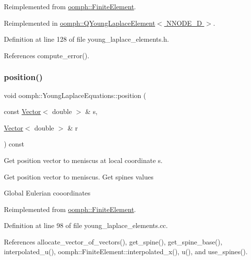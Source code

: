 Reimplemented from \hyperlink{classoomph_1_1FiniteElement_a2a8426dccd57b927be0ae0eec00d0479}{oomph\+::\+Finite\+Element}.



Reimplemented in \hyperlink{classoomph_1_1QYoungLaplaceElement_adfb61689825789e178eeb2985c4985e8}{oomph\+::\+Q\+Young\+Laplace\+Element$<$ N\+N\+O\+D\+E\+\_\+D $>$}.



Definition at line 128 of file young\+\_\+laplace\+\_\+elements.\+h.



References compute\+\_\+error().

\mbox{\label{classoomph_1_1YoungLaplaceEquations_ab1b3d09214a0985a331564135fe14053}} 
\subsubsection{\texorpdfstring{position()}{position()}}
{\footnotesize\ttfamily void oomph\+::\+Young\+Laplace\+Equations\+::position (\begin{DoxyParamCaption}\item[{const \hyperlink{classoomph_1_1Vector}{Vector}$<$ double $>$ \&}]{s,  }\item[{\hyperlink{classoomph_1_1Vector}{Vector}$<$ double $>$ \&}]{r }\end{DoxyParamCaption}) const\hspace{0.3cm}{\ttfamily [virtual]}}



Get position vector to meniscus at local coordinate s. 

Get position vector to meniscus. Get spines values

Global Eulerian cooordinates 

Reimplemented from \hyperlink{classoomph_1_1FiniteElement_a1d33f53e2b2813fba8a0e8b458bf2047}{oomph\+::\+Finite\+Element}.



Definition at line 98 of file young\+\_\+laplace\+\_\+elements.\+cc.



References allocate\+\_\+vector\+\_\+of\+\_\+vectors(), get\+\_\+spine(), get\+\_\+spine\+\_\+base(), interpolated\+\_\+u(), oomph\+::\+Finite\+Element\+::interpolated\+\_\+x(), u(), and use\+\_\+spines().



